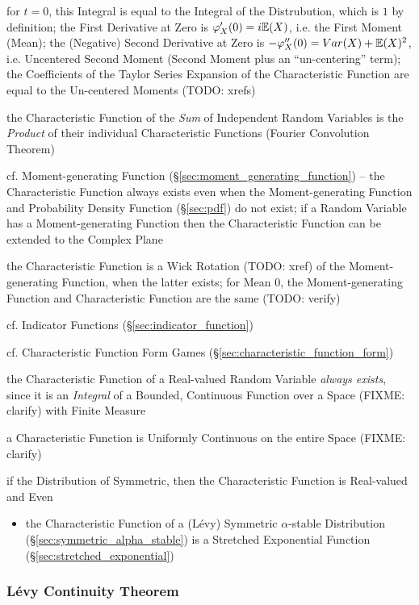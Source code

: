 for $t = 0$, this Integral is equal to the Integral of the Distrubution, which
is $1$ by definition; the First Derivative at Zero is
$\varphi'_X(0) = i \mathbb{E}(X)$, i.e. the First Moment (Mean); the (Negative)
Second Derivative at Zero is $-\varphi''_X(0) = Var(X) + \mathbb{E}(X)^2$, i.e.
Uncentered Second Moment (Second Moment plus an ``un-centering'' term); the
Coefficients of the Taylor Series Expansion of the Characteristic Function are
equal to the Un-centered Moments (TODO: xrefs)

the Characteristic Function of the \emph{Sum} of Independent Random Variables is
the \emph{Product} of their individual Characteristic Functions (Fourier
Convolution Theorem)

cf. Moment-generating Function (\S\ref{sec:moment_generating_function}) --
the Characteristic Function always exists even when the Moment-generating
Function and Probability Density Function (\S\ref{sec:pdf}) do not exist;
if a Random Variable has a Moment-generating Function then the Characteristic
Function can be extended to the Complex Plane

the Characteristic Function is a Wick Rotation (TODO: xref) of the
Moment-generating Function, when the latter exists; for Mean $0$, the
Moment-generating Function and Characteristic Function are the same (TODO:
verify)

\fist cf. Indicator Functions (\S\ref{sec:indicator_function})

cf. Characteristic Function Form Games
(\S\ref{sec:characteristic_function_form})

the Characteristic Function of a Real-valued Random Variable \emph{always
exists}, since it is an \emph{Integral} of a Bounded, Continuous Function over a
Space (FIXME: clarify) with Finite Measure

a Characteristic Function is Uniformly Continuous on the entire Space (FIXME:
clarify)

if the Distribution of Symmetric, then the Characteristic Function is
Real-valued and Even

\begin{itemize}
  \item the Characteristic Function of a (L\'evy) Symmetric $\alpha$-stable
    Distribution (\S\ref{sec:symmetric_alpha_stable}) is a Stretched Exponential
    Function (\S\ref{sec:stretched_exponential})
\end{itemize}



\subsubsection{L\'evy Continuity Theorem}\label{sec:levy_continuity}

